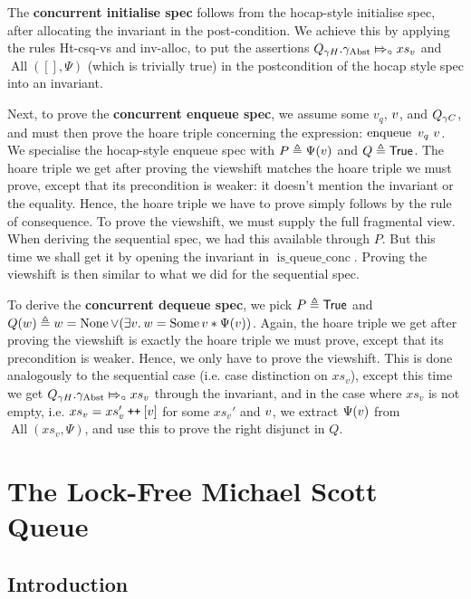 \documentclass[a4paper, 10pt]{report}
\theoremstyle{definition}
\newcommand{\enqueue}{\operatorname{enqueue}}
\newcommand{\isqueueconc}{\operatorname{is\_queue\_conc}}
\newcommand{\vq}{v_q}
\newcommand{\AllP}{\operatorname{All}}
\newcommand{\nodeval}{\valB}
\newcommand{\absvalue}{\val}
\newcommand{\absvalueList}{xs_v}
\newcommand{\Qgconc}{Q_{\gname C}}
\newcommand{\Qghocap}{Q_{\gname H}}
\newcommand{\gabst}{\gname_{\mathrm{Abst}}}
\newcommand\catenate{\mathbin{\text{\ttfamily\upshape ++}}}
\newcommand{\abstractstatefullfrag}[2]{#1 \Mapsto_{\circ} #2}
\begin{document}
The \textbf{concurrent initialise spec} follows from the hocap-style initialise spec, after allocating the invariant in the post-condition. We achieve this by applying the rules Ht-csq-vs and inv-alloc, to put the assertions $\abstractstatefullfrag{\Qghocap.\gabst}{\absvalueList}$ and $\AllP([], \Psi)$ (which is trivially true) in the postcondition of the hocap style spec into an invariant.

Next, to prove the \textbf{concurrent enqueue spec}, we assume some $\vq$, $\absvalue$, and $\Qgconc$, and must then prove the hoare triple concerning the expression: $\enqueue \ \vq \ \absvalue$. We specialise the hocap-style enqueue spec with $P \eqdef \Psi(\absvalue)$ and $Q \triangleq \textsf{True}$. The hoare triple we get after proving the viewshift matches the hoare triple we must prove, except that its precondition is weaker: it doesn't mention the invariant or the equality. Hence, the hoare triple we have to prove simply follows by the rule of consequence.
To prove the viewshift, we must supply the full fragmental view. When deriving the sequential spec, we had this available through $P$. But this time we shall get it by opening the invariant in $\isqueueconc$. Proving the viewshift is then similar to what we did for the sequential spec.

To derive the \textbf{concurrent dequeue spec}, we pick $P \triangleq \textsf{True}$ and $Q(\nodeval) \eqdef \nodeval = \None \lor (\Exists \absvalue . \nodeval = \Some \absvalue \star \Psi(\absvalue))$. Again, the hoare triple we get after proving the viewshift is exactly the hoare triple we must prove, except that its precondition is weaker. Hence, we only have to prove the viewshift. This is done analogously to the sequential case (i.e. case distinction on $\absvalueList$), except this time we get $\abstractstatefullfrag{\Qghocap.\gabst}{\absvalueList}$ through the invariant, and in the case where $\absvalueList$ is not empty, i.e. $\absvalueList = \absvalueList' \catenate [\absvalue]$ for some $\absvalueList'$ and $\absvalue$, we extract $\Psi(\absvalue)$ from $\AllP(\absvalueList, \Psi)$, and use this to prove the right disjunct in $Q$.


\chapter{The Lock-Free Michael Scott Queue}
\label{ch:LFMSQ}

\section{Introduction}
\label{LFMSQ:section:introduction}
\end{document}
